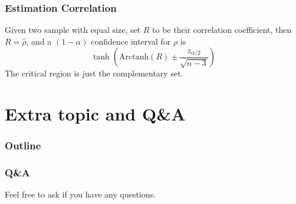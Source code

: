 \documentclass{beamer}
\begin{document}
\begin{frame}
    \frametitle{Estimation Correlation}

    Given two sample with equal size, set $R$ to be their correlation coefficient, then $R=\hat{\rho}$, and a $(1-\alpha)$ confidence interval for $\rho$ is
    \[\tanh(\text{Arctanh}(R)\pm \frac{z_{\alpha/2}}{\sqrt{n-3}})\]
    The critical region is just the complementary set.

\end{frame}

\section{Extra topic and Q\&A}
\begin{frame}
    \frametitle{Outline}
    \tableofcontents[currentsection]
\end{frame}



\begin{frame}
    \frametitle{Q\&A}
    
    Feel free to ask if you have any questions.\par
    
    
    
\end{frame}
\end{document}
